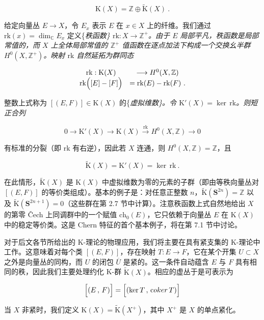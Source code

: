 \documentclass[11pt,a4paper]{ctexart}
\begin{document}
\[{\mathrm K}(X)= {\mathbb{Z}}\oplus \widetilde{{\mathrm K}}(X)\ .\]

给定向量丛 \(E\rightarrow X\)，令 \(E_x\) 表示 \(E\) 在 \(x\in X\) 上的纤维。我们通过 \(\mathrm{rk}(x)=\dim_{{\mathbb{C}}} E_{x}\) 定义\{\it 秩函数\} \(\mathrm{rk}:X\rightarrow {\mathbb{Z}}^+\)。由于 \(E\) 局部平凡，秩函数是局部常值的，而 \(X\) 上全体局部常值的 \({\mathbb{Z}}^+\) 值函数在逐点加法下构成一个交换幺半群 \(H^0(X, {\mathbb{Z}}^+)\)。映射 \(\mathrm{rk}\) 自然延拓为群同态

\[\begin{matrix}
\mathrm{rk}: {\mathrm K}(X)&\longrightarrow H^0(X,{\mathbb{Z}})\\
\mathrm{rk}\Bigl([E]-[F]\Bigr)&=\mathrm{rk}(E)-\mathrm{rk}(F)\ .
\end{matrix}\]

整数上式称为 \([(E,F)]\in {\mathrm K}(X)\) 的\{\it 虚拟维数\}。令 \({\mathrm K}'(X)=\ker\,\mathrm{rk}\)。则短正合列

\[0\longrightarrow {\mathrm K}'(X)\longrightarrow {\mathrm K}(X)\stackrel{\mathrm{rk}}
{\longrightarrow}H^0(X,{\mathbb{Z}})\longrightarrow 0\]

有标准的分裂（即 \(\mathrm{rk}\) 有右逆），因此若 \(X\) 连通，则 \(H^0(X,{\mathbb{Z}})= {\mathbb{Z}}\)，且

\[\widetilde{{\mathrm K}}(X)= {\mathrm K}'(X)=\ker\,\mathrm{rk}\ .\]

在此情形，\(\widetilde{{\mathrm K}}(X)\) 是 \({\mathrm K}(X)\) 中虚拟维数为零的元素的子群（即由等秩向量丛对 \([(E,F)]\) 的等价类组成）。基本的例子是：对任意正整数 \(n\)，\(\widetilde{{\mathrm K}}({\mathbf S}^{2n})={\mathbb{Z}}\) 以及 \(\widetilde{{\mathrm K}}({\mathbf S}^{2n+1})=0\)（这些群在第 2.7 节中计算）。注意秩函数上式自然地给出 \(X\) 的第零 \v{C}ech 上同调群中的一个赋值 \(\mathrm{ch}_0(E)\)，它只依赖于向量丛 \(E\) 在 \({\mathrm K}(X)\) 中的稳定等价类。这是 Chern 特征的首个基本例子，将在第 7.1 节中讨论。

对于后文各节所给出的 K-理论的物理应用，我们将主要在具有紧支集的 K-理论中工作。这意味着对每个类 \([(E,F)]\)，存在映射 \(T:E\to F\)，它在某个开集 \(U\subset X\) 之外是向量丛的同构，而 \(U\) 的闭包 \(\overline U\) 是紧的。这一条件自动蕴含 \(E\) 与 \(F\) 具有相同的秩，因此我们主要处理约化 K-群 \(\widetilde{{\mathrm K}}(X)\)。相应的虚丛于是可表示为

\[\Bigl[(E\,,\,F)\Bigr]=\Bigl[(\ker T\,,\,{\mathrm coker}\,T)\Bigr]\]

当 \(X\) 非紧时，我们定义 \({\mathrm K}(X)=\widetilde{{\mathrm K}}(X^+)\)，其中 \(X^+\) 是 \(X\) 的单点紧化。
\end{document}
